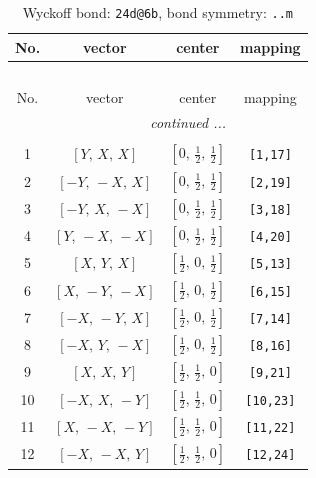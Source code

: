 \documentclass[fleqn,8pt]{jsarticle}
\begin{document}
\begin{longtable}{cccc}
\caption{Wyckoff bond: {\tt 24d@6b}, bond symmetry: {\tt ..m}}
 \\
 \hline \hline
No. & vector & center & mapping \\ \hline \endfirsthead

\multicolumn{3}{l}{\tablename\ \thetable{}} \\
 \hline \hline
No. & vector & center & mapping \\ \hline \endhead

 \hline \hline
\multicolumn{3}{r}{\footnotesize\it continued ...} \\ \endfoot

 \hline \hline
\multicolumn{3}{r}{} \\ \endlastfoot

1 & $\left[ Y,\, X,\, X \right]$ & $\left[ 0,\, \frac{1}{2},\, \frac{1}{2} \right]$ & {\tt [1,17]} \\ \hline
2 & $\left[ - Y,\, - X,\, X \right]$ & $\left[ 0,\, \frac{1}{2},\, \frac{1}{2} \right]$ & {\tt [2,19]} \\ \hline
3 & $\left[ - Y,\, X,\, - X \right]$ & $\left[ 0,\, \frac{1}{2},\, \frac{1}{2} \right]$ & {\tt [3,18]} \\ \hline
4 & $\left[ Y,\, - X,\, - X \right]$ & $\left[ 0,\, \frac{1}{2},\, \frac{1}{2} \right]$ & {\tt [4,20]} \\ \hline
5 & $\left[ X,\, Y,\, X \right]$ & $\left[ \frac{1}{2},\, 0,\, \frac{1}{2} \right]$ & {\tt [5,13]} \\ \hline
6 & $\left[ X,\, - Y,\, - X \right]$ & $\left[ \frac{1}{2},\, 0,\, \frac{1}{2} \right]$ & {\tt [6,15]} \\ \hline
7 & $\left[ - X,\, - Y,\, X \right]$ & $\left[ \frac{1}{2},\, 0,\, \frac{1}{2} \right]$ & {\tt [7,14]} \\ \hline
8 & $\left[ - X,\, Y,\, - X \right]$ & $\left[ \frac{1}{2},\, 0,\, \frac{1}{2} \right]$ & {\tt [8,16]} \\ \hline
9 & $\left[ X,\, X,\, Y \right]$ & $\left[ \frac{1}{2},\, \frac{1}{2},\, 0 \right]$ & {\tt [9,21]} \\ \hline
10 & $\left[ - X,\, X,\, - Y \right]$ & $\left[ \frac{1}{2},\, \frac{1}{2},\, 0 \right]$ & {\tt [10,23]} \\ \hline
11 & $\left[ X,\, - X,\, - Y \right]$ & $\left[ \frac{1}{2},\, \frac{1}{2},\, 0 \right]$ & {\tt [11,22]} \\ \hline
12 & $\left[ - X,\, - X,\, Y \right]$ & $\left[ \frac{1}{2},\, \frac{1}{2},\, 0 \right]$ & {\tt [12,24]} \\
\end{longtable}
\end{document}
